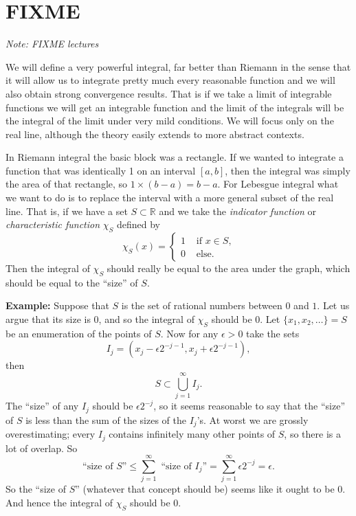 \documentclass[12pt]{book}
\newcommand{\R}{{\mathbb{R}}}
\newcommand{\sectionnotes}[1]{\noindent \emph{Note: #1} \medskip \par}
\theoremstyle{plain}
\theoremstyle{remark}
\theoremstyle{definition}
\theoremstyle{exercise}
\theoremstyle{example}
\begin{document}


\section{FIXME}
\label{sec:FIXME}

\sectionnotes{FIXME lectures}

We will define a very powerful integral, far better than Riemann in the
sense that it will allow us to integrate pretty much every reasonable
function and we will also obtain strong convergence results.  That is
if we take a limit of integrable functions we will get an integrable
function and the limit of the integrals will be the integral of the limit
under very mild conditions.  We will focus only on the real line, although
the theory easily extends to more abstract contexts.

\medskip

In Riemann integral the basic block was a rectangle.  If we wanted to
integrate a function that was identically 1 on an interval $[a,b]$, then the
integral was simply the area of that rectangle, so $1 \times (b-a) = b-a$.
For Lebesgue integral what we want to do is to replace the interval with a
more general subset of the real line.  That is, if we have a set $S \subset
\R$ and we take the \emph{indicator function} or \emph{characteristic
function} $\chi_S$ defined by
$$
\chi_S (x) =
\begin{cases}
1 & \text{ if $x \in S$,} \\
0 & \text{ else.}
\end{cases}
$$
Then the integral of $\chi_S$ should really be equal to the area under the
graph, which should be equal to the ``size'' of $S$.

\medskip

\textbf{Example:}
Suppose that $S$ is the set of rational numbers between $0$ and $1$.  Let us
argue that its size is 0, and so the integral of $\chi_S$ should be 0.
Let $\{ x_1, x_2, \ldots \} = S$ be an enumeration
of the points of $S$.  Now for any $\epsilon > 0$
take the sets
$$I_j = (x_j - \epsilon 2^{-j-1}, 
x_j + \epsilon 2^{-j-1}),$$
then
$$
S \subset \bigcup_{j=1}^\infty I_j .
$$
The ``size'' of any $I_j$ should be $\epsilon 2^{-j}$, so it seems reasonable
to say that the ``size'' of $S$ is less than the sum of the sizes of the $I_j$'s.
At worst we are grossly overestimating; every $I_j$ contains
infinitely
many other points of $S$, so there is a lot of overlap.  So
$$
\text{``size of $S$''} \leq
\sum_{j=1}^\infty \text{ ``size of $I_j$''} =
\sum_{j=1}^\infty \epsilon 2^{-j} = \epsilon.
$$
So the ``size of $S$'' (whatever that concept should be) seems like it ought
to be 0.  And hence the integral of $\chi_S$ should be 0.
\end{document}
